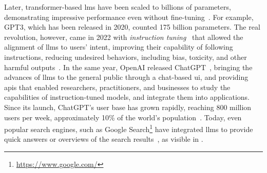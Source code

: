 Later, transformer-based \acp{lm} have been scaled to billions of parameters, demonstrating impressive performance even without fine-tuning~\cite{gpt_lm_few_shot_learners_2020}. For example, GPT3, which has been released in 2020, counted 175 billion parameters. The real revolution, however, came in 2022 with \emph{instruction tuning}~\cite{instruct_gpt_2022} that allowed the alignment of \acfp{llm} to users' intent, improving their capability of following instructions, reducing undesired behaviors, including bias, toxicity, and other harmful outputs~\cite{instruct_gpt_2022}. In the same year, OpenAI released ChatGPT~\cite{openai2025chatgpt}, bringing the advances of \acp{llm} to the general public through a chat-based \acf{ui}, and providing \acp{api} that enabled researchers, practitioners, and businesses to study the capabilities of instruction-tuned models, and integrate them into applications. Since its launch, ChatGPT's user base has grown rapidly, reaching 800 million users per week, approximately 10\% of the world's population~\cite{Sor2025chatgpt}.
%
Today, even popular search engines, such as Google Search\footnote{\url{https://www.google.com/}} have integrated \acp{llm} to provide quick answers or overviews of the search results~\cite{Google2024generative_search}, as visible in .





